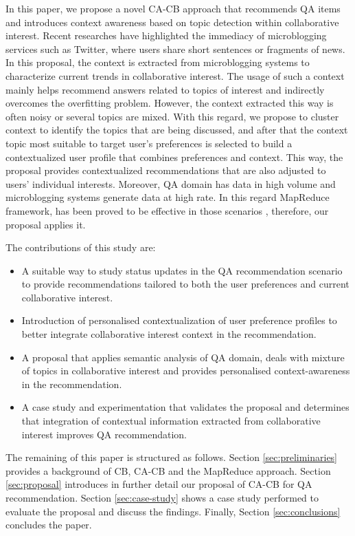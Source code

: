 \documentclass[preprint]{elsarticle}
\begin{document}
\begin{spacing}{1.5}
In this paper, we propose a novel CA-CB approach that recommends QA items and introduces context awareness based on topic detection within collaborative interest. Recent researches \cite{Hermida2010} have highlighted the immediacy of microblogging services such as Twitter, where users share short sentences or fragments of news. In this proposal, the context is extracted from microblogging systems to characterize current trends in collaborative interest. The usage of such a context mainly helps recommend answers related to topics of interest and indirectly overcomes the overfitting problem. However, the context extracted this way is often noisy or several topics are mixed. With this regard, we propose to cluster context to identify the topics that are being discussed, and after that the context topic most suitable to target user's preferences is selected to build a contextualized user profile that combines preferences and context. This way, the proposal provides contextualized recommendations that are also adjusted to users' individual interests. Moreover, QA domain has data in high volume and microblogging systems generate data at high rate. In this regard MapReduce framework, has been proved to be effective in those scenarios \cite{Maillo2017,Nair2015}, therefore, our proposal applies it.

The contributions of this study are:
\begin{itemize}
	\item A suitable way to study status updates in the QA recommendation scenario to provide recommendations tailored to both the user preferences and current collaborative interest.
	\item Introduction of personalised contextualization of user preference profiles to better integrate collaborative interest context in the recommendation.
	\item A proposal that applies semantic analysis of QA domain, deals with mixture of topics in collaborative interest and provides personalised context-awareness in the recommendation.
	\item A case study and experimentation that validates the proposal and determines that integration of contextual information extracted from collaborative interest improves QA recommendation.
\end{itemize}

The remaining of this paper is structured as follows. Section \ref{sec:preliminaries} provides a background of CB, CA-CB and the MapReduce approach. Section \ref{sec:proposal} introduces in further detail our proposal of CA-CB for QA recommendation. Section \ref{sec:case-study} shows a case study performed to evaluate the proposal and discuss the findings. Finally, Section \ref{sec:conclusions} concludes the paper.


\end{spacing}
\end{document}
